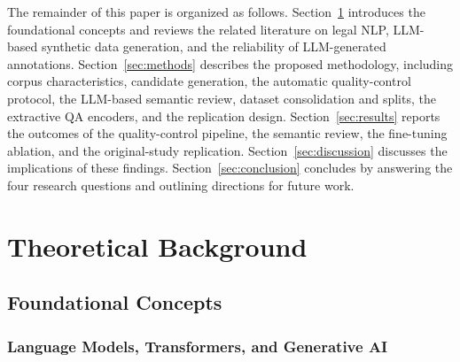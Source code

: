 \documentclass[graybox]{SNmult}
\begin{document}


The remainder of this paper is organized as follows. Section~\ref{sec:related-work}
introduces the foundational concepts and reviews the related literature on
legal NLP, LLM-based synthetic data generation, and the reliability of
LLM-generated annotations. Section~\ref{sec:methods} describes the proposed
methodology, including corpus characteristics, candidate generation, the
automatic quality-control protocol, the LLM-based semantic review, dataset
consolidation and splits, the extractive QA encoders, and the replication
design. Section~\ref{sec:results} reports the outcomes of the quality-control
pipeline, the semantic review, the fine-tuning ablation, and the original-study
replication. Section~\ref{sec:discussion} discusses the implications of these
findings. Section~\ref{sec:conclusion} concludes by answering the four
research questions and outlining directions for future work.

\section{Theoretical Background}
\label{sec:related-work}

\subsection{Foundational Concepts}
\label{sec:foundations}

\subsubsection{Language Models, Transformers, and Generative AI}
\end{document}
